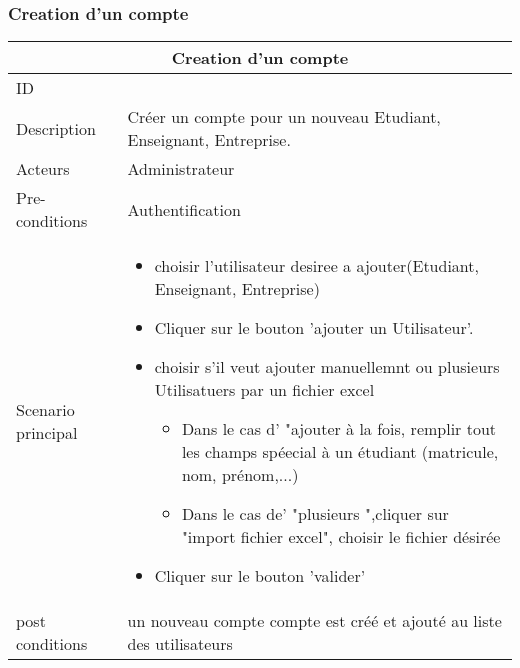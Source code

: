 \documentclass[11pt,fleqn]{book} %
\begin{document}
\subsubsection{Creation d'un compte}
\begin{center}
\begin{tabularx}{1\textwidth} { | p{4cm} | >{\raggedright\arraybackslash}X |  }
  \hline
  \multicolumn{2}{|c|}{Creation d'un compte} \\
 \hline
 ID & 1  \\
 \hline
 Description  & Créer un compte pour un nouveau Etudiant, Enseignant, Entreprise. \\
  \hline
 Acteurs  & Administrateur   \\
  \hline
 Pre-conditions  & Authentification  \\
  \hline
 Scenario principal  & 
 \begin{itemize}
     \item choisir l'utilisateur desiree a ajouter(Etudiant, Enseignant, Entreprise)
     \item Cliquer sur le bouton ’ajouter un Utilisateur’.
     \item choisir s'il veut ajouter manuellemnt ou plusieurs Utilisatuers par un fichier excel
     \begin{itemize}
         \item Dans le cas d' "ajouter à la fois, remplir tout les champs spéecial à un étudiant (matricule, nom, prénom,...)
     \end{itemize}
          \begin{itemize}
         \item Dans le cas de' "plusieurs ",cliquer sur "import fichier excel", choisir le fichier désirée
     \end{itemize}
       \item Cliquer sur le bouton ’valider’

 \end{itemize}\\
  \hline
 post conditions  & un nouveau compte compte  est créé et ajouté au liste des utilisateurs \\
  \hline
\end{tabularx}
\label{tbl:nicetablelesstable}
\end{center}

\end{document}
